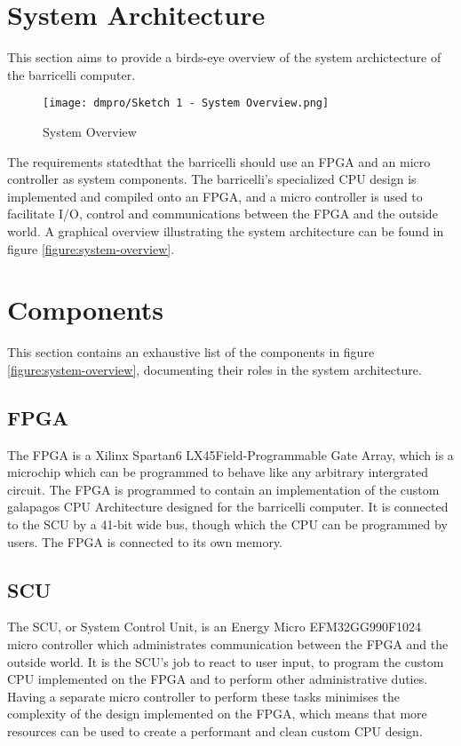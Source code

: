 \section{System Architecture}

This section aims to provide a birds-eye overview of the system archictecture of the \Gls{barricelli} computer.

\begin{figure}[H]
\texttt{[image: dmpro/Sketch 1 - System Overview.png]}
\caption{System Overview}
\label{figure:system-overview}
\end{figure}

The requirements stated\cn that the \Gls{barricelli} should use an FPGA and an micro controller as system components.
The \Gls{barricelli}'s specialized CPU design is implemented and compiled onto an FPGA, and a micro controller is used to facilitate I/O, control and communications between the FPGA and the outside world.
A graphical overview illustrating the system architecture can be found in figure \vref{figure:system-overview}.

\section{Components}

This section contains an exhaustive list of the components in figure \vref{figure:system-overview}, documenting their roles in the system architecture.

\subsection{FPGA}

The FPGA is a Xilinx Spartan6 LX45\cn Field-Programmable Gate Array, which is a microchip which can be programmed to behave like any arbitrary intergrated circuit.
The FPGA is programmed to contain an implementation of the custom \Gls{galapagos} CPU Architecture designed for the \Gls{barricelli} computer.
It is connected to the SCU by a 41-bit wide bus, though which the CPU can be programmed by users.
The FPGA is connected to its own memory.

\subsection{SCU}

The SCU, or System Control Unit, is an Energy Micro EFM32GG990F1024 micro controller which administrates communication between the FPGA and the outside world.
It is the SCU's job to react to user input, to program the custom CPU implemented on the FPGA and to perform other administrative duties.
Having a separate micro controller to perform these tasks minimises the complexity of the design implemented on the FPGA, which means that more resources can be used to create a performant and clean custom CPU design.

